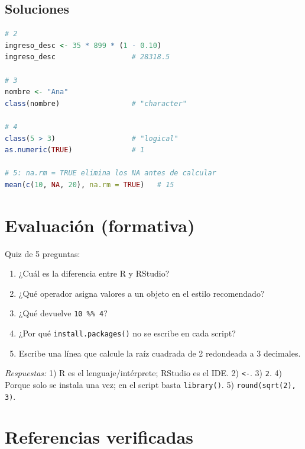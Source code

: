 \subsection{Soluciones}

\begin{lstlisting}[language=R]
# 2
ingreso_desc <- 35 * 899 * (1 - 0.10)
ingreso_desc                  # 28318.5

# 3
nombre <- "Ana"
class(nombre)                 # "character"

# 4
class(5 > 3)                  # "logical"
as.numeric(TRUE)              # 1

# 5: na.rm = TRUE elimina los NA antes de calcular
mean(c(10, NA, 20), na.rm = TRUE)   # 15
\end{lstlisting}

\section{Evaluación (formativa)}

Quiz de 5 preguntas:

\begin{enumerate}
\def\labelenumi{\arabic{enumi}.}
\tightlist
\item
  ¿Cuál es la diferencia entre R y RStudio?
\item
  ¿Qué operador asigna valores a un objeto en el estilo recomendado?
\item
  ¿Qué devuelve \passthrough{\lstinline!10 \%\% 4!}?
\item
  ¿Por qué \passthrough{\lstinline!install.packages()!} no se escribe en
  cada script?
\item
  Escribe una línea que calcule la raíz cuadrada de 2 redondeada a 3
  decimales.
\end{enumerate}

\emph{Respuestas:} 1) R es el lenguaje/intérprete; RStudio es el IDE. 2)
\passthrough{\lstinline!<-!}. 3) \passthrough{\lstinline!2!}. 4) Porque
solo se instala una vez; en el script basta
\passthrough{\lstinline!library()!}. 5)
\passthrough{\lstinline!round(sqrt(2), 3)!}.

\section{Referencias verificadas}

